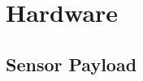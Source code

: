 \documentclass[10pt,twocolumn,letterpaper]{article}
\begin{document}


\section{Hardware}\label{sec:hardware}

\subsection{Sensor Payload}
\end{document}
